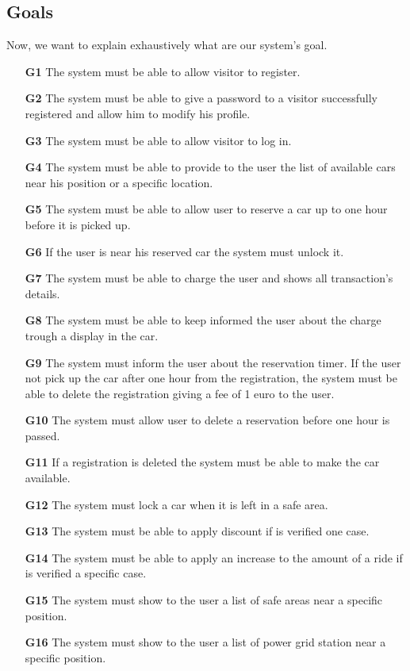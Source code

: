 \subsection{Goals} \label{subsec:goals}
Now, we want to explain exhaustively what are our system's goal.
\begin{itemize}
\item[\textbf{G1}] The system must be able to allow visitor to register. 
\item[\textbf{G2}] The system must be able to give a password to a visitor successfully registered and allow him to modify his profile.
\item[\textbf{G3}] The system must be able to allow visitor to log in.
\item[\textbf{G4}] The system must be able to provide to the user the list of available cars near his position or a specific location.
\item[\textbf{G5}] The system must be able to allow user to reserve a car up to one hour before it is picked up.
\item[\textbf{G6}] If the user is near his reserved car the system must unlock it.
\item[\textbf{G7}] The system must be able to charge the user and shows all transaction's details.
\item[\textbf{G8}] The system must be able to keep informed the user about the charge trough a display in the car.
\item[\textbf{G9}] The system must inform the user about the reservation timer. If the user not pick up the car after one hour from the registration, the system must be able to delete the registration giving a fee of 1 euro to the user.
\item[\textbf{G10}] The system must allow user to delete a reservation before one hour is passed.
\item[\textbf{G11}] If a registration is deleted the system must be able to make the car available.
\item[\textbf{G12}] The system must lock a car when it is left in a safe area.
\item[\textbf{G13}] The system must be able to apply discount if is verified one case.
\item[\textbf{G14}] The system must be able to apply an increase to the amount of a ride if is verified a specific case.
\item[\textbf{G15}] The system must show to the user a list of safe areas near a specific position.
\item[\textbf{G16}] The system must show to the user a list of power grid station near a specific position.

\end{itemize}


